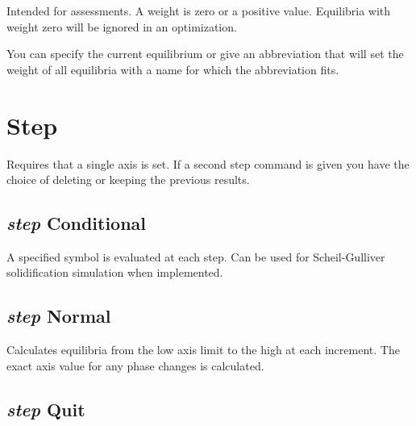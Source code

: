 \documentclass[12pt]{article}
\begin{document}
Intended for assessments.  A weight is zero or a positive value.
Equilibria with weight zero will be ignored in an optimization.  

You can specify the current equilibrium or give an abbreviation that
will set the weight of all equilibria with a name for which the
abbreviation fits.

\section{Step }

Requires that a single axis is set.  If a second step command is given
you have the choice of deleting or keeping the previous results.

\subsection{{\em step} Conditional}

A specified symbol is evaluated at each step.  Can be used for
Scheil-Gulliver solidification simulation when implemented.

\subsection{{\em step} Normal}

Calculates equilibria from the low axis limit to the high at each
increment.  The exact axis value for any phase changes is calculated.

\subsection{{\em step} Quit}
\end{document}
